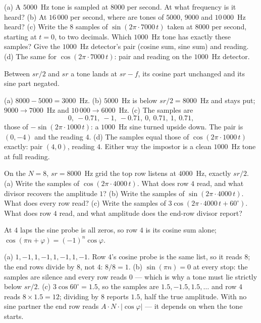 \begin{problem}
(a) A $5000$~Hz tone is sampled at $8000$ per second. At what frequency
is it heard? (b) At $16\,000$ per second, where are tones of $5000$,
$9000$ and $10\,000$~Hz heard? (c) Write the $8$ samples of $\sin(2\pi
\cdot 7000\, t)$ taken at $8000$ per second, starting at $t = 0$, to
two decimals. Which $1000$~Hz tone has exactly these samples? Give the
$1000$~Hz detector's pair (cosine sum, sine sum) and reading. (d) The
same for $\cos(2\pi \cdot 7000\, t)$: pair and reading on the
$1000$~Hz detector.
\begin{hint}
Between $sr/2$ and $sr$ a tone lands at $sr - f$, its cosine part
unchanged and its sine part negated.
\end{hint}
\begin{solution}
(a) $8000 - 5000 = 3000$~Hz. (b) $5000$~Hz is below $sr/2 = 8000$~Hz
and stays put; $9000 \to 7000$~Hz and $10\,000 \to 6000$~Hz. (c) The samples are
\[
  0,\ -0.71,\ -1,\ -0.71,\ 0,\ 0.71,\ 1,\ 0.71 ,
\]
those of $-\sin(2\pi \cdot 1000\, t)$: a $1000$~Hz sine turned upside
down. The pair is $(0, -4)$
and the reading $4$. (d) The samples equal those of $\cos(2\pi \cdot
1000\, t)$ exactly: pair $(4, 0)$, reading $4$. Either way the
impostor is a clean $1000$~Hz tone at full reading.
\end{solution}
\end{problem}

\begin{problem}
On the $N = 8$, $sr = 8000$~Hz grid the top row listens at $4000$~Hz,
exactly $sr/2$. (a) Write the samples of $\cos(2\pi \cdot 4000\, t)$.
What does row $4$ read, and what divisor recovers the amplitude $1$?
(b) Write the samples of $\sin(2\pi \cdot 4000\, t)$. What does every
row read? (c) Write the samples of $3 \cos(2\pi \cdot 4000\, t +
60^\circ)$. What does row $4$ read, and what amplitude does the
end-row divisor report?
\begin{hint}
At $4$ laps the sine probe is all zeros, so row $4$ is its cosine sum
alone; $\cos(\pi n + \varphi) = (-1)^n \cos\varphi$.
\end{hint}
\begin{solution}
(a) $1, -1, 1, -1, 1, -1, 1, -1$. Row $4$'s cosine probe is the same
list, so it reads $8$; the end rows divide by $8$, not $4$: $8/8 = 1$.
(b) $\sin(\pi n) = 0$ at every stop: the samples are silence and every
row reads $0$ — which is why a tone must lie strictly below $sr/2$.
(c) $3 \cos 60^\circ = 1.5$, so the samples are $1.5, -1.5, 1.5,
\ldots$ and row $4$ reads $8 \times 1.5 = 12$; dividing by $8$ reports
$1.5$, half the true amplitude. With no sine partner the end row reads
$A \cdot N \cdot |\cos\varphi|$ — it depends on when the tone starts.
\end{solution}
\end{problem}

